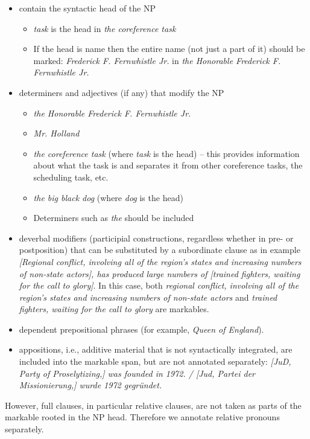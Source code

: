 \documentclass[a4paper]{article}
\begin{document}
\begin{itemize}
\item contain the syntactic head of the NP
\begin{itemize}
\item {\sl task} is the head in {\sl the coreference task}
\item If the head is name then the entire name (not just a part of it) should be marked: {\sl Frederick F. Fernwhistle Jr.} in {\sl the Honorable Frederick F. Fernwhistle Jr.}
\end{itemize}

\item  determiners and adjectives (if any) that modify the NP
\begin{itemize}
\item {\sl the Honorable Frederick F. Fernwhistle Jr.}
\item {\sl Mr. Holland}
\item {\sl the coreference task} (where {\sl task} is the head) -- this provides information about what the task is and separates it from other coreference tasks, the scheduling task, etc.
\item {\sl the big black dog} (where {\sl dog} is the head)
\item Determiners such as {\sl the} should be included
\end{itemize}

\item deverbal modifiers (participial constructions, regardless whether in pre- or postposition) that
can be substituted by a subordinate clause as in example  {\sl [Regional conflict, involving all of the region's states and increasing numbers of non-state actors], has produced large numbers of [trained fighters, waiting for the call to glory]}. 
In this case, both {\sl regional conflict, involving all of the region’s states and increasing numbers of non-state actors} and {\sl trained fighters, waiting for the call to glory} are markables.
\item dependent prepositional phrases (for example, {\sl Queen of England}).
\item  appositions, i.e., additive material that is not syntactically integrated, are included into the markable span, but are not annotated separately: {\sl [JuD, Party of Proselytizing,] was founded in 1972. / [Jud, Partei der Missionierung,] wurde 1972 gegründet.}
\end{itemize}

However, full clauses, in particular relative clauses, are not taken as parts of the markable rooted in the NP head. Therefore we annotate relative pronouns separately.
\end{document}
